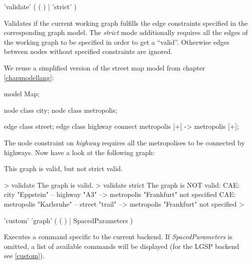 \begin{rail}
  'validate' ( ( ) | 'strict' )
\end{rail}
Validates if the current working graph fulfills the edge constraints specified in the corresponding graph model. The \emph{strict} mode additionally requires all the edges of the working graph to be specified in order to get a ``valid''. Otherwise edges between nodes without specified constraints are ignored.\\
\begin{example}
We reuse a simplified version of the street map model from chapter \ref{chapmodellang}:
\begin{grgen} 
model Map;

node class city;
node class metropolis;

edge class street;
edge class highway
      connect metropolis [+] -> metropolis [+];
\end{grgen}
The node constraint on \emph{highway} requires all the metropolises to be connected by highways. Now have a look at the following graph:
\begin{center}
\end{center}

This graph is valid, but not strict valid.
\begin{grshell} 
> validate
The graph is valid.
> validate strict
The graph is NOT valid:
  CAE: city "Eppstein" -- highway "A3" --> metropolis "Frankfurt" not specified
  CAE: metropolis "Karlsruhe" -- street "trail" --> metropolis "Frankfurt" not specified
>
\end{grshell}
\end{example}

\begin{rail}
  'custom' 'graph' ( ( ) | SpacedParameters )
\end{rail}
Executes a command specific to the current backend. If \emph{SpacedParameters} is omitted, a list of available commands will be displayed (for the LGSP backend see \ref{custom}).


